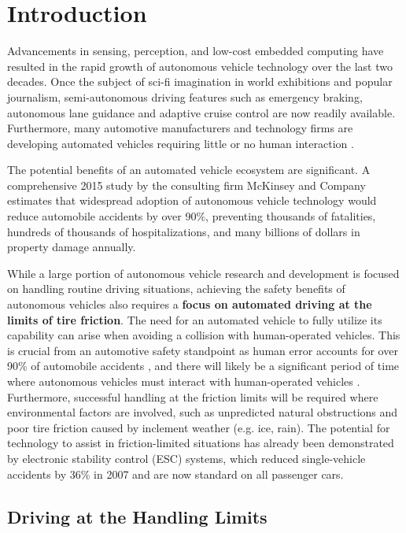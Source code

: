 \chapter{Introduction} 
\label{chapter1}

Advancements in sensing, perception, and low-cost embedded computing have resulted in the rapid growth of 
autonomous vehicle technology over the last two decades. Once the subject of sci-fi imagination in world exhibitions and 
popular journalism, semi-autonomous driving features such as emergency braking, autonomous lane guidance
and adaptive cruise control are now readily available. Furthermore, many automotive manufacturers
 and technology firms are developing automated vehicles requiring little or no human interaction \cite{hocky}\cite{alexdavies}\cite{iglauer}\cite{curtis}\cite{heatherkelly}\cite{mikeramsey}. 

The potential benefits of an automated vehicle ecosystem are significant. A comprehensive 2015 study by the consulting 
firm McKinsey and Company \cite{McK} estimates that widespread adoption of
autonomous vehicle technology would reduce automobile accidents by over 90\%, preventing thousands of fatalities, hundreds of
thousands of hospitalizations, and many billions of dollars in property damage annually.

While a large portion of autonomous vehicle research and development is focused on handling routine driving situations, achieving the safety benefits of
autonomous vehicles also requires a \textbf{focus on automated driving at the limits of tire friction}. The need for an automated vehicle to 
fully utilize its capability can arise when avoiding a collision with human-operated vehicles. This is crucial from an automotive safety
standpoint as human error accounts for over 90\% of automobile accidents \cite{bws}, and there will likely be a significant period of time where
autonomous vehicles must interact with human-operated vehicles \cite{McK}. Furthermore, successful handling at the friction limits will
be required where environmental factors are involved, such as unpredicted natural obstructions and poor tire friction caused by inclement weather (e.g. ice, rain). 
The potential for technology to assist in friction-limited situations has already been demonstrated by electronic stability control (ESC) systems, which reduced 
single-vehicle accidents by 36\% in 2007 \cite{jendang} and are now standard on all passenger cars. 

\section{Driving at the Handling Limits}

